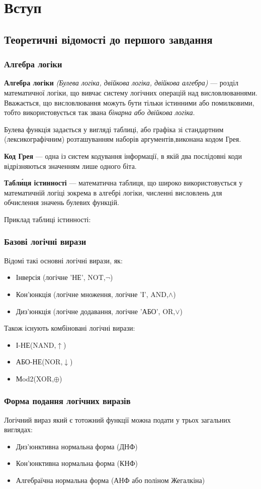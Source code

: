\chapter{Вступ}
\section{Теоретичні відомості до першого завдання}
\subsection{Алгебра логіки}
\textbf{Алгебра логіки} \emph{(Булева логіка, двійкова логіка, двійкова алгебра)} — розділ математичної логіки, що вивчає систему логічних операцій над висловлюваннями. Вважається, що висловлювання можуть бути тільки істинними або помилковими, тобто використовується так звана \emph{бінарна або двійкова логіка}.

Булева функція задається у вигляді таблиці, або графіка зі стандартним (лексикографічним) розташуванням наборів аргументів,виконана кодом Грея.

\textbf{Код Грея} — одна із систем кодування інформації, в якій два послідовні коди відрізняються значенням лише одного біта.

\textbf{Табли́ця істинності} — математична таблиця, що широко використовується у математичній логіці зокрема в алгебрі логіки, численні висловлень для обчислення значень булевих функцій.

Приклад таблиці істинності:
\newpage
\subsection{Базові логічні вирази}
Відомі такі основні логічні вирази, як:
\begin{itemize}
	\item Інверсія (логічне  'НЕ', NOT,$\lnot$)
	\item Кон'юнкція (логічне множення, логічне  'І', AND,$\wedge$)
	\item Диз'юнкція (логічне додавання, логічне  'АБО', OR,$\lor$)
\end{itemize}

Також існують комбіновані логічні вирази:
\begin{itemize}
	\item І-НЕ(NAND,$\uparrow$)
	\item АБО-НЕ(NOR,$\downarrow$)
	\item Мod2(XOR,$\oplus$)
\end{itemize}
\newpage
\subsection{Форма подання логічних виразів}
Логічний вираз який є тотожний функції можна подати у трьох загальних виглядах:
\begin{itemize}
	\item Диз'юнктивна нормальна форма (ДНФ)
	\item Кон'юнктивна нормальна форма (КНФ)
	\item Алгебраїчна нормальна форма (АНФ або поліном Жегалкіна)
\end{itemize}
\newpage
